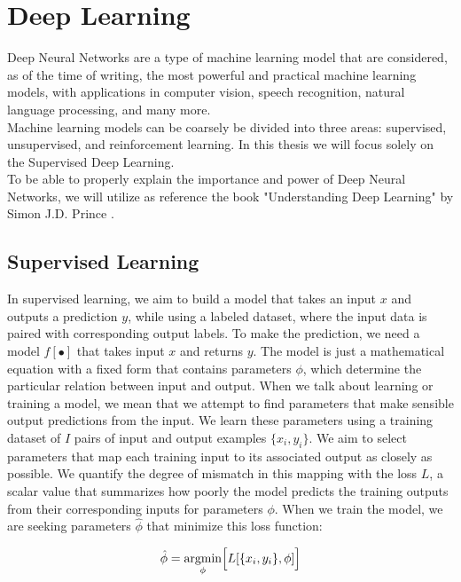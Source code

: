 \chapter{Deep Learning}
\thispagestyle{chapterfancy}

Deep Neural Networks are a type of machine learning model that are considered, as of the time of writing, the most powerful and practical machine learning models, with applications in computer vision, speech recognition, natural language processing, and many more. \\
Machine learning models can be coarsely be divided into three areas: supervised, unsupervised, and reinforcement learning. In this thesis we will focus solely on the Supervised Deep Learning. \\
To be able to properly explain the importance and power of Deep Neural Networks, we will utilize as reference the book "Understanding Deep Learning" by Simon J.D. Prince \cite{prince2024understanding}. 

\section{Supervised Learning}
 
In supervised learning, we aim to build a model that takes an input $x$ and outputs a prediction $y$, while using a labeled dataset, where the input data is paired with corresponding output labels. To make the prediction, we need a model $f[\bullet]$ that takes input $x$ and returns $y$. The model is just a mathematical equation with a fixed form that contains parameters $\phi$, which determine the particular relation between input and output. When we talk about learning or training a model, we mean that we attempt to find parameters that make sensible output predictions from the input. We learn these parameters using a training dataset of $I$ pairs of input and output examples $\{x_{i}, y_{i}\}$. We aim to select parameters that map each training input to its associated output as closely as possible. We quantify the degree of mismatch in this mapping with the loss $L$, a scalar value that summarizes how poorly the model predicts the training outputs
from their corresponding inputs for parameters $\phi$. When we train the model, we are seeking parameters $\hat{\phi}$ that minimize this loss function:

\begin{equation}
    \hat{\phi}=\underset{\phi}{\text{argmin}}\Bigl[L[\{x_{i},y_{i}\},\phi]\Bigr]
\end{equation}

